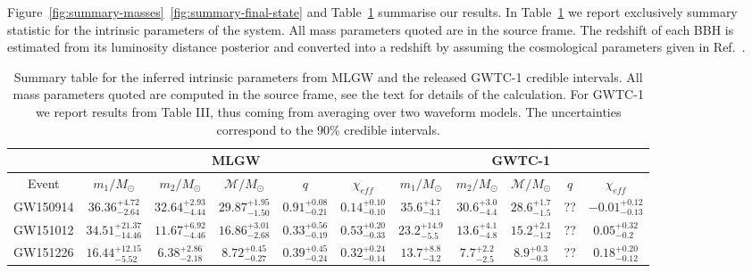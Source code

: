 Figure~\ref{fig:summary-masses}~\ref{fig:summary-final-state} and Table~\ref{tab:summary} summarise our results. In Table~\ref{tab:summary} we report exclusively 
summary statistic for the intrinsic parameters of the system. All mass parameters quoted are in the source frame. The redshift of each BBH is estimated 
from its luminosity distance posterior and converted into a redshift by assuming the cosmological parameters given in Ref.~\cite{}.

\begin{table}[]
\centering
\caption{Summary table for the inferred intrinsic parameters from MLGW and the released GWTC-1 credible intervals. All mass parameters quoted are computed in the source frame, see the text for details of the calculation. For GWTC-1 we report results from Table III, thus coming from averaging over two waveform models. The uncertainties correspond to the 90\% credible intervals.
}
\label{tab:summary}
\begin{tabular}{cccccc|ccccc}
                              & \multicolumn{5}{c}{MLGW}                                                   & \multicolumn{5}{c|}{GWTC-1}                                                \\ \hline
\multicolumn{1}{c|}{Event}    & $m_1/M_\odot$ & $m_2/M_\odot$ & $\mathcal{M}/M_\odot$ & $q$ & $\chi_{eff}$ & $m_1/M_\odot$ & $m_2/M_\odot$ & $\mathcal{M}/M_\odot$ & $q$ & $\chi_{eff}$ \\ \hline
\multicolumn{1}{c|}{GW150914} & $36.36_{-2.64}^{+4.72}$& $32.64_{-4.44}^{+2.93}$& $29.87_{-1.50}^{+1.95}$& $0.91_{-0.21}^{+0.08}$& $0.14_{-0.10}^{+0.10}$&    $35.6_{-3.1}^{+4.7}$           &   $30.6_{-4.4}^{+3.0}$            & $28.6_{-1.5}^{+1.7}$                      & ?? & $-0.01_{-0.13}^{+0.12}$              \\
\multicolumn{1}{c|}{GW151012}& $34.51_{-14.46}^{+21.37}$& $11.67_{-4.46}^{+6.92}$& $16.86_{-2.68}^{+3.01}$& $0.33_{-0.19}^{+0.56}$& $0.53_{-0.33}^{+0.20}$&   $23.2_{-5.5}^{+14.9}$            &   $13.6_{-4.8}^{+4.1}$            &  $15.2_{-1.2}^{+2.1}$                     & ?? & $0.05_{-0.2}^{+0.32}$              \\
\multicolumn{1}{c|}{GW151226} & $16.44_{-5.52}^{+12.15}$& $6.38_{-2.18}^{+2.86}$& $8.72_{-0.27}^{+0.45}$& $0.39_{-0.24}^{+0.45}$& $0.32_{-0.14}^{+0.24}$&   $13.7_{-3.2}^{+8.8}$            & $7.7_{-2.5}^{+2.2}$               &  $8.9_{-0.3}^{+0.3}$                     & ?? & $0.18_{-0.12}^{+0.20}$              \\

\end{tabular}
\end{table}
